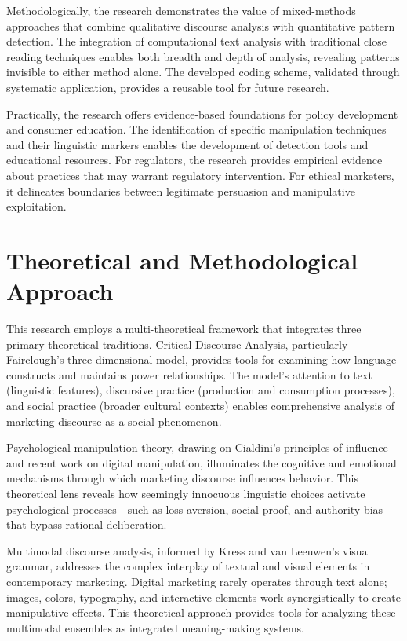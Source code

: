 Methodologically, the research demonstrates the value of mixed-methods approaches that combine qualitative discourse analysis with quantitative pattern detection. The integration of computational text analysis with traditional close reading techniques enables both breadth and depth of analysis, revealing patterns invisible to either method alone. The developed coding scheme, validated through systematic application, provides a reusable tool for future research.

Practically, the research offers evidence-based foundations for policy development and consumer education. The identification of specific manipulation techniques and their linguistic markers enables the development of detection tools and educational resources. For regulators, the research provides empirical evidence about practices that may warrant regulatory intervention. For ethical marketers, it delineates boundaries between legitimate persuasion and manipulative exploitation.

\section{Theoretical and Methodological Approach}
\label{sec:theoretical_approach}

This research employs a multi-theoretical framework that integrates three primary theoretical traditions. Critical Discourse Analysis, particularly Fairclough's three-dimensional model, provides tools for examining how language constructs and maintains power relationships. The model's attention to text (linguistic features), discursive practice (production and consumption processes), and social practice (broader cultural contexts) enables comprehensive analysis of marketing discourse as a social phenomenon.

Psychological manipulation theory, drawing on Cialdini's principles of influence and recent work on digital manipulation, illuminates the cognitive and emotional mechanisms through which marketing discourse influences behavior. This theoretical lens reveals how seemingly innocuous linguistic choices activate psychological processes—such as loss aversion, social proof, and authority bias—that bypass rational deliberation.

Multimodal discourse analysis, informed by Kress and van Leeuwen's visual grammar, addresses the complex interplay of textual and visual elements in contemporary marketing. Digital marketing rarely operates through text alone; images, colors, typography, and interactive elements work synergistically to create manipulative effects. This theoretical approach provides tools for analyzing these multimodal ensembles as integrated meaning-making systems.

